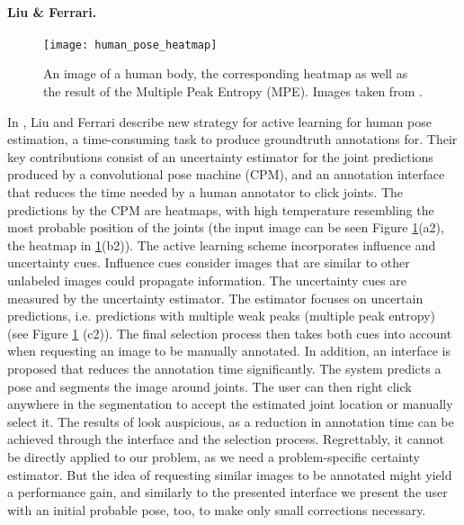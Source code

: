 \paragraph{Liu \& Ferrari.}

\begin{figure}[!tbp]
	\centering
    \texttt{[image: human\_pose\_heatmap]}
    \caption{An image of a human body, the corresponding heatmap as well as the result of the Multiple Peak Entropy (MPE). Images taken from \cite{humanpose}.}
    \label{fig:humanpose}
\end{figure}
In \cite{humanpose}, Liu and Ferrari describe new strategy for active learning for human pose estimation, a time-consuming task to produce groundtruth annotations for. Their key contributions consist of an uncertainty estimator for the joint predictions produced by a convolutional pose machine (CPM), and an annotation interface that reduces the time needed by a human annotator to click joints. The predictions by the CPM are heatmaps, with high temperature resembling the most probable position of the joints (the input image can be seen Figure \ref{fig:humanpose}(a2), the heatmap in \ref{fig:humanpose}(b2)).
\nnewline
The active learning scheme incorporates influence and uncertainty cues. Influence cues consider images that are similar to other unlabeled images could propagate information. The uncertainty cues are measured by the uncertainty estimator. The estimator focuses on uncertain predictions, i.e. predictions with multiple weak peaks (multiple peak entropy) (see Figure \ref{fig:humanpose} (c2)). The final selection process then takes both cues into account when requesting an image to be manually annotated.
\nnewline
In addition, an interface is proposed that reduces the annotation time significantly. The system predicts a pose and segments the image around joints. The user can then right click anywhere in the segmentation to accept the estimated joint location or manually select it.
\nnewline
The results of \cite{humanpose} look auspicious, as a reduction in annotation time can be achieved through the interface and the selection process. Regrettably, it cannot be directly applied to our problem, as we need a problem-specific certainty estimator. But the idea of requesting similar images to be annotated might yield a performance gain, and similarly to the presented interface we present the user with an initial probable pose, too, to make only small corrections necessary.
